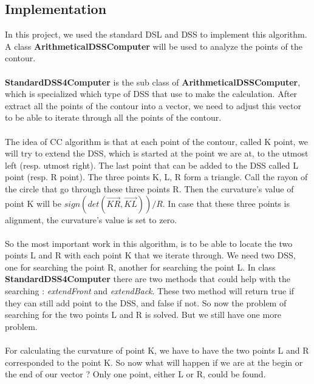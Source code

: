 \subsection{Implementation}
In this project, we used the standard DSL and DSS to implement this algorithm. A class \textbf{ArithmeticalDSSComputer} will be used to analyze the points of the contour.

\paragraph{}
\textbf{StandardDSS4Computer} is the sub class of \textbf{ArithmeticalDSSComputer}, which is specialized which type of DSS that use to make the calculation. After extract all the points of the contour into a vector, we need to adjust this vector to be able to iterate through all the points of the contour. 

\paragraph{}
The idea of CC algorithm is that at each point of the contour, called K point, we will try to extend the DSS, which is started at the point we are at, to the utmost left (resp. utmost right). The last point that can be added to the DSS called L point (resp. R point). The three points K, L, R form a triangle. Call the rayon of the circle that go through these three points R. Then the curvature's value of point K will be $sign(det(\overrightarrow{KR}, \overrightarrow{KL}))/R$.  In case that these three points is alignment, the curvature's value is set to zero.

\paragraph{}
So the most important work in this algorithm, is to be able to locate the two points L and R with each point K that we iterate through. We need two DSS, one for searching the point R, another for searching the point L. In class \textbf{StandardDSS4Computer} there are two methods that could help with the searching : \textit{extendFront} and \textit{extendBack}. These two method will return true if they can still add point to the DSS, and false if not. So now the problem of searching for the two points L and R is solved. But we still have one more problem.

\paragraph{}
For calculating the curvature of point K, we have to have the two points L and R corresponded to the point K. So now what will happen if we are at the begin or the end of our vector ? Only one point, either L or R, could be found.







